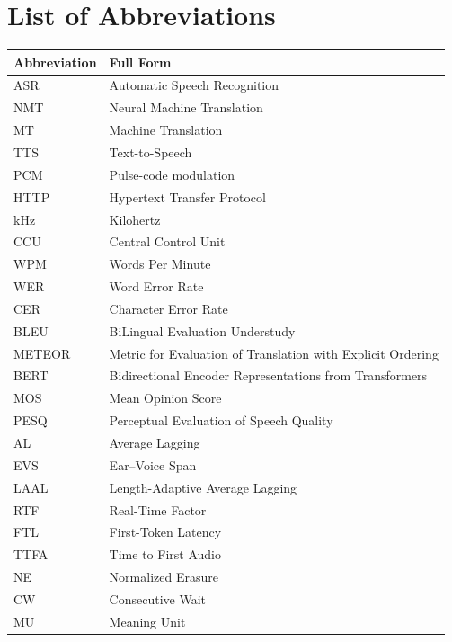 \chapter*{List of Abbreviations}

\begin{table}[h!]
\centering
\begin{tabular}{ll}
\textbf{Abbreviation} & \textbf{Full Form} \\
\midrule
ASR      & Automatic Speech Recognition \\
NMT      & Neural Machine Translation \\
MT       & Machine Translation \\
TTS      & Text-to-Speech \\
PCM      & Pulse-code modulation \\
HTTP     & Hypertext Transfer Protocol \\
kHz      & Kilohertz \\
CCU      & Central Control Unit \\
WPM      & Words Per Minute \\
WER      & Word Error Rate   \\
CER      & Character Error Rate \\
BLEU     & BiLingual Evaluation Understudy \\
METEOR   & Metric for Evaluation of Translation with Explicit Ordering \\
BERT     & Bidirectional Encoder Representations from Transformers \\
MOS      & Mean Opinion Score \\
PESQ     & Perceptual Evaluation of Speech Quality \\
AL       & Average Lagging \\
EVS      & Ear–Voice Span \\
LAAL     & Length-Adaptive Average Lagging \\
RTF      & Real-Time Factor \\
FTL      & First-Token Latency \\
TTFA     & Time to First Audio \\
NE       & Normalized Erasure \\
CW       & Consecutive Wait \\
MU       & Meaning Unit \\
\end{tabular}
\end{table}